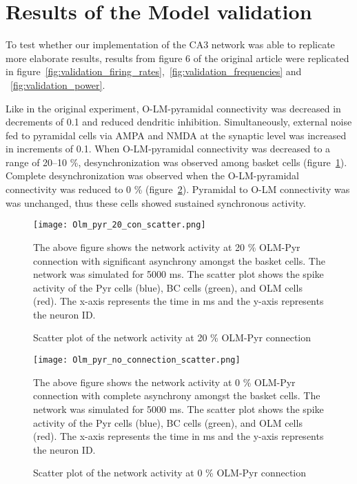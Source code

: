 \section{Results of the Model validation}
To test whether our implementation of the CA3 network was able to replicate
more elaborate results, results from figure 6 of the original
\textcite{sanjayImpairedDendriticInhibition2015} article were replicated in
figure~\ref{fig:validation_firing_rates},~\ref{fig:validation_frequencies} and
~\ref{fig:validation_power}.

Like in the original experiment, O-LM-pyramidal connectivity was decreased in decrements of 0.1 and reduced dendritic inhibition.
Simultaneously, external noise fed to pyramidal cells via AMPA and NMDA at the synaptic level was increased in increments of 0.1. 
When O-LM-pyramidal connectivity was decreased to a range of 20--10 \%, desynchronization was observed among basket cells (figure~\ref{fig:scatterplot_20_con_olm_pyr}).
Complete desynchronization was observed when the O-LM-pyramidal connectivity was reduced to 0 \% (figure~\ref{fig:scatterplot_0_con_olm_pyr}).
Pyramidal to O-LM connectivity was was unchanged, thus these cells showed sustained synchronous activity.

\begin{figure}[htbp]
    \centering
    \texttt{[image: Olm\_pyr\_20\_con\_scatter.png]}
    \caption[20 \% OLM-Pyr connection scatter plot]{Scatter plot of the network activity at 20 \% OLM-Pyr connection}\label{fig:scatterplot_20_con_olm_pyr}
    \begin{minipage}{0.9\textwidth}
        The above figure shows the network activity at 20 \% OLM-Pyr connection with significant asynchrony amongst the basket cells.
        The network was simulated for 5000 ms. 
        The scatter plot shows the spike activity of the Pyr cells (blue), BC cells (green), and OLM cells (red). 
        The x-axis represents the time in ms and the y-axis represents the neuron ID\@. 
    \end{minipage}
\end{figure}

\begin{figure}[htbp]
    \centering
    \texttt{[image: Olm\_pyr\_no\_connection\_scatter.png]}
    \caption[0 \% OLM-Pyr connection scatter plot]{Scatter plot of the network activity at 0 \% OLM-Pyr connection}\label{fig:scatterplot_0_con_olm_pyr}
    \begin{minipage}{0.9\textwidth}
        The above figure shows the network activity at 0 \% OLM-Pyr connection with complete asynchrony amongst the basket cells.
        The network was simulated for 5000 ms. 
        The scatter plot shows the spike activity of the Pyr cells (blue), BC cells (green), and OLM cells (red). 
        The x-axis represents the time in ms and the y-axis represents the neuron ID\@. 
    \end{minipage}
\end{figure}

